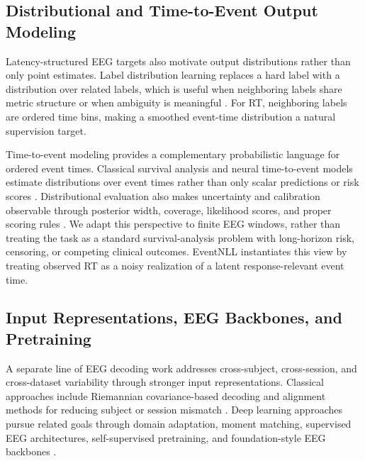 \documentclass[12pt]{article}
\begin{document}
\subsection{Distributional and Time-to-Event Output Modeling}
Latency-structured EEG targets also motivate output distributions rather than only point estimates. Label distribution learning replaces a hard label with a distribution over related labels, which is useful when neighboring labels share metric structure or when ambiguity is meaningful \citep{Geng2016LabelDistributionLearning}. For RT, neighboring labels are ordered time bins, making a smoothed event-time distribution a natural supervision target.

Time-to-event modeling provides a complementary probabilistic language for ordered event times. Classical survival analysis and neural time-to-event models estimate distributions over event times rather than only scalar predictions or risk scores \citep{Cox1972CoxPH,Lee2018DeepHit}. Distributional evaluation also makes uncertainty and calibration observable through posterior width, coverage, likelihood scores, and proper scoring rules \citep{Chapfuwa2023Calibration,Haider2020SurvivalDistributions}. We adapt this perspective to finite EEG windows, rather than treating the task as a standard survival-analysis problem with long-horizon risk, censoring, or competing clinical outcomes. EventNLL instantiates this view by treating observed RT as a noisy realization of a latent response-relevant event time.

\subsection{Input Representations, EEG Backbones, and Pretraining}
A separate line of EEG decoding work addresses cross-subject, cross-session, and cross-dataset variability through stronger input representations. Classical approaches include Riemannian covariance-based decoding and alignment methods for reducing subject or session mismatch \citep{Barachant2012RiemannianBCI,Jayaram2016TransferLearningBCI,Zanini2018RiemannianTL,HeWu2020EuclideanAlignment}. Deep learning approaches pursue related goals through domain adaptation, moment matching, supervised EEG architectures, self-supervised pretraining, and foundation-style EEG backbones \citep{Ganin2016DANN,SunSaenko2016DeepCORAL,Kostas2021BENDR,wang2024eegpt,Jiang2024LaBraM,Chen2024EEGFormer,Wang2025EEGMamba,ElOuahidi2025REVE,Yue2024BrainGPT}.
\end{document}
